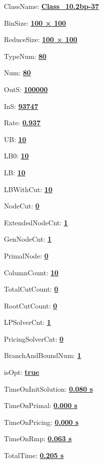 \documentclass[11pt]{article}
\begin{document}
\pagestyle{empty}


ClassName: \underline{\textbf{Class_10.2bp-37}}
\par
BinSize: \underline{\textbf{100 × 100}}
\par
ReduceSize: \underline{\textbf{100 × 100}}
\par
TypeNum: \underline{\textbf{80}}
\par
Num: \underline{\textbf{80}}
\par
OutS: \underline{\textbf{100000}}
\par
InS: \underline{\textbf{93747}}
\par
Rate: \underline{\textbf{0.937}}
\par
UB: \underline{\textbf{10}}
\par
LB0: \underline{\textbf{10}}
\par
LB: \underline{\textbf{10}}
\par
LBWithCut: \underline{\textbf{10}}
\par
NodeCut: \underline{\textbf{0}}
\par
ExtendedNodeCnt: \underline{\textbf{1}}
\par
GenNodeCnt: \underline{\textbf{1}}
\par
PrimalNode: \underline{\textbf{0}}
\par
ColumnCount: \underline{\textbf{10}}
\par
TotalCutCount: \underline{\textbf{0}}
\par
RootCutCount: \underline{\textbf{0}}
\par
LPSolverCnt: \underline{\textbf{1}}
\par
PricingSolverCnt: \underline{\textbf{0}}
\par
BranchAndBoundNum: \underline{\textbf{1}}
\par
isOpt: \underline{\textbf{true}}
\par
TimeOnInitSolution: \underline{\textbf{0.080 s}}
\par
TimeOnPrimal: \underline{\textbf{0.000 s}}
\par
TimeOnPricing: \underline{\textbf{0.000 s}}
\par
TimeOnRmp: \underline{\textbf{0.063 s}}
\par
TotalTime: \underline{\textbf{0.205 s}}
\par
\newpage


\end{document}
